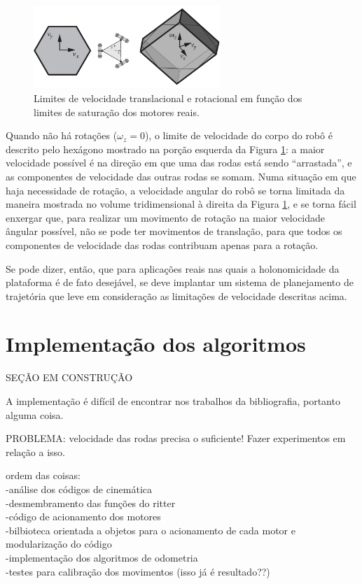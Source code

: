 \begin{figure}[h]
  \centering
  \includegraphics[width = 0.63\textwidth]{imagens/twist_sat}
  \caption{Limites de velocidade translacional e rotacional em função dos limites de saturação dos motores reais.}
  \label{fig:twist_sat}
\end{figure}

Quando não há rotações ($\omega_z = 0$), o limite de velocidade do corpo do robô é descrito pelo hexágono mostrado na porção esquerda da Figura \ref{fig:twist_sat}: a maior velocidade possível é na direção em que uma das rodas está sendo ``arrastada'', e as componentes de velocidade das outras rodas se somam. Numa situação em que haja necessidade de rotação, a velocidade angular do robô se torna limitada da maneira mostrada no volume tridimensional à direita da Figura \ref{fig:twist_sat}, e se torna fácil enxergar que, para realizar um movimento de rotação na maior velocidade ângular possível, não se pode ter movimentos de translação, para que todos os componentes de velocidade das rodas contribuam apenas para a rotação.

Se pode dizer, então, que para aplicações reais nas quais a holonomicidade da plataforma é de fato desejável, se deve implantar um sistema de planejamento de trajetória que leve em consideração as limitações de velocidade descritas acima.

\section{Implementação dos algoritmos}
\label{sec:software}

SEÇÃO EM CONSTRUÇÃO

A implementação é difícil de encontrar nos trabalhos da bibliografia, portanto alguma coisa.

PROBLEMA: velocidade das rodas precisa o suficiente! Fazer experimentos em relação a isso.

ordem das coisas: \\
-análise dos códigos de cinemática \\
-desmembramento das funções do ritter \\
-código de acionamento dos motores \\
-bilbioteca orientada a objetos para o acionamento de cada motor e modularização do código\\
-implementação dos algoritmos de odometria \\
-testes para calibração dos movimentos (isso já é resultado??) \\

